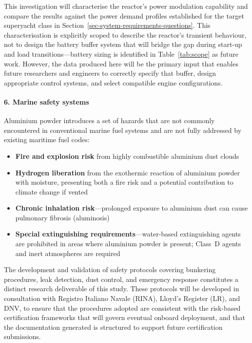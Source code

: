 \documentclass[12pt]{article}
\begin{document}
This investigation will characterise the reactor's power modulation capability and 
compare the results against the power demand profiles established for the target 
superyacht class in Section~\ref{sec-system-requirements-questions}. This characterisation is 
explicitly scoped to describe the reactor's transient behaviour, not to design the 
battery buffer system that will bridge the gap during start-up and load 
transitions---battery sizing is identified in Table~\ref{tab:scope} as future work. 
However, the data produced here will be the primary input that enables future 
researchers and engineers to correctly specify that buffer, design appropriate control 
systems, and select compatible engine configurations.

\paragraph{6. Marine safety systems}

Aluminium powder introduces a set of hazards that are not commonly encountered in 
conventional marine fuel systems and are not fully addressed by existing maritime 
fuel codes:

\begin{itemize}
    \item \textbf{Fire and explosion risk} from highly combustible aluminium dust 
    clouds
    \item \textbf{Hydrogen liberation} from the exothermic reaction of aluminium 
    powder with moisture, presenting both a fire risk and a potential contribution 
    to climate change if vented
    \item \textbf{Chronic inhalation risk}---prolonged exposure to aluminium dust 
    can cause pulmonary fibrosis (aluminosis)
    \item \textbf{Special extinguishing requirements}---water-based extinguishing 
    agents are prohibited in areas where aluminium powder is present; Class~D agents 
    and inert atmospheres are required
\end{itemize}

The development and validation of safety protocols covering bunkering procedures, 
leak detection, dust control, and emergency response constitutes a distinct research 
deliverable of this study. These protocols will be developed in consultation with 
Registro Italiano Navale (RINA), Lloyd's Register (LR), and DNV, to ensure that the 
procedures adopted are consistent with the risk-based certification frameworks that 
will govern eventual onboard deployment, and that the documentation generated is 
structured to support future certification submissions.
\end{document}
